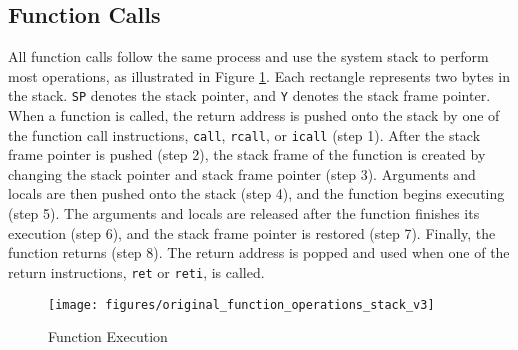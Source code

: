 \subsection{Function Calls}
\vspace{-10pt}
All function calls follow the same process and use the system stack to perform most operations, as illustrated in Figure \ref{fig:original_function_operation}. 
Each rectangle represents two bytes in the stack. 
\texttt{SP} denotes the stack pointer, and \texttt{Y} denotes the stack frame pointer. When a function is called, the return address is pushed onto the stack by one of the function call instructions, \texttt{call}, \texttt{rcall}, or \texttt{icall} (step 1). After the stack frame pointer is pushed (step 2), the stack frame of the function is created by changing the stack pointer and stack frame pointer (step 3). Arguments and locals are then pushed onto the stack (step 4), and the function begins executing (step 5). The arguments and locals are released after the function finishes its execution (step 6), and the stack frame pointer is restored (step 7). Finally, the function returns (step 8). The return address is popped and used when one of the return instructions, \texttt{ret} or \texttt{reti}, is called.
\vspace{-15pt}
\begin{figure}
	\centering
	\texttt{[image: figures/original\_function\_operations\_stack\_v3]}
	\vspace{-15pt}
	\caption{Function Execution}\label{fig:original_function_operation}
\end{figure}
\vspace{-10pt}
